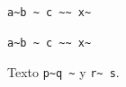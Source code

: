 \documentclass{article}
\begin{document}
\begin{lstlisting}
a~b ~ c ~~ x~
\end{lstlisting}
\begin{lstlisting}[basicstyle=\ttfamily]
a~b ~ c ~~ x~
\end{lstlisting}
Texto \lstinline|p~q ~| y \lstinline[basicstyle=\ttfamily]|r~ s|.
\end{document}
